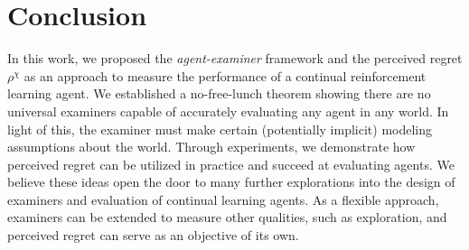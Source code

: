 \section{Conclusion}
In this work, we proposed the \textit{agent-examiner} framework and the perceived regret $\rho^\chi$ as an approach to measure the performance of a continual reinforcement learning agent. 
We established a no-free-lunch theorem showing there are no universal examiners capable of accurately evaluating any agent in any world. In light of this, the examiner must make certain (potentially implicit) modeling assumptions about the world. 
Through experiments, we demonstrate how perceived regret can be utilized in practice and succeed at evaluating agents. 
We believe these ideas open the door to many further explorations into the design of examiners and evaluation of continual learning agents. As a flexible approach, examiners can be extended to measure other qualities, such as exploration, and perceived regret can serve as an objective of its own. 




